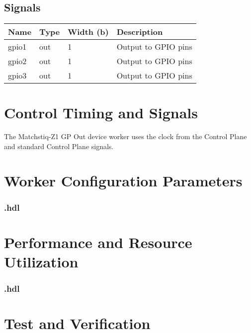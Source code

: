 \begin{landscape}
\section*{Signals}
	\begin{scriptsize}
		\begin{tabular}{|M{2.5cm}|M{3cm}|M{6.5cm}|M{9.2cm}|}
			\hline
			Name         & Type   & Width (b) & Description                       \\
			\hline
			gpio1    & out & 1 & Output to GPIO pins            \\
			\hline
			gpio2    & out & 1 & Output to GPIO pins            \\
			\hline
			gpio3    & out & 1 & Output to GPIO pins            \\
			\hline
		\end{tabular}
	\end{scriptsize}
\end{landscape}

\section*{Control Timing and Signals}
\begin{flushleft}
The Matchstiq-Z1 GP Out device worker uses the clock from the Control Plane and standard Control Plane signals.
\end{flushleft}

\begin{landscape}
\section*{Worker Configuration Parameters}
\subsubsection*{\comp.hdl}
%
\section*{Performance and Resource Utilization}
\subsubsection*{\comp.hdl}
%
\end{landscape}



\section*{Test and Verification}
\normalsize

